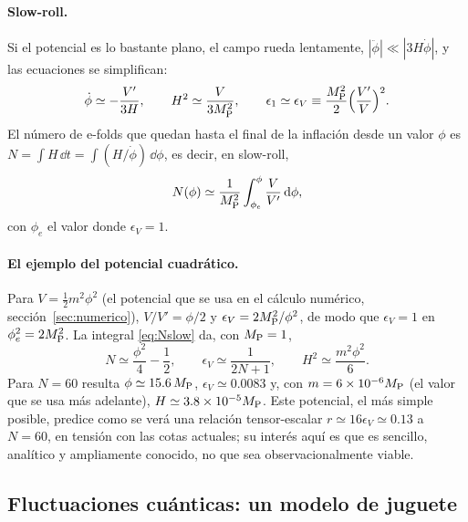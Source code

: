 \paragraph{Slow-roll.} Si el potencial es lo bastante plano, el campo rueda lentamente, $|\ddot\phi|\ll|3H\dot\phi|$, y las ecuaciones se simplifican:
\begin{equation}
\dot\phi\simeq-\frac{V'}{3H},\qquad H^2\simeq\frac{V}{3M_{\rm P}^2},\qquad \epsilon_1\simeq\epsilon_V\equiv\frac{M_{\rm P}^2}{2}\Big(\frac{V'}{V}\Big)^2.
\label{eq:slowroll}
\end{equation}
El número de e-folds que quedan hasta el final de la inflación desde un valor $\phi$ es $N=\int H\,\dd t=\int(H/\dot\phi)\,\dd\phi$, es decir, en slow-roll,
\begin{equation}
N(\phi)\simeq\frac{1}{M_{\rm P}^2}\int_{\phi_e}^{\phi}\frac{V}{V'}\,\mathrm d\phi,
\label{eq:Nslow}
\end{equation}
con $\phi_e$ el valor donde $\epsilon_V=1$.

\paragraph{El ejemplo del potencial cuadrático.} Para $V=\tfrac12 m^2\phi^2$ (el potencial que se usa en el cálculo numérico, sección~\ref{sec:numerico}), $V/V'=\phi/2$ y $\epsilon_V=2M_{\rm P}^2/\phi^2$, de modo que $\epsilon_V=1$ en $\phi_e^2=2M_{\rm P}^2$. La integral \eqref{eq:Nslow} da, con $M_{\rm P}=1$,
\begin{equation}
N\simeq\frac{\phi^2}{4}-\frac12,\qquad \epsilon_V\simeq\frac{1}{2N+1},\qquad H^2\simeq\frac{m^2\phi^2}{6}.
\label{eq:phi2}
\end{equation}
Para $N=60$ resulta $\phi\simeq15.6\,M_{\rm P}$, $\epsilon_V\simeq0.0083$ y, con $m=6\times10^{-6}M_{\rm P}$ (el valor que se usa más adelante), $H\simeq3.8\times10^{-5}M_{\rm P}$. Este potencial, el más simple posible, predice como se verá una relación tensor-escalar $r\simeq16\epsilon_V\simeq0.13$ a $N=60$, en tensión con las cotas actuales; su interés aquí es que es sencillo, analítico y ampliamente conocido, no que sea observacionalmente viable.

\subsection{Fluctuaciones cuánticas: un modelo de juguete}
\label{sec:inf-cuantico}

